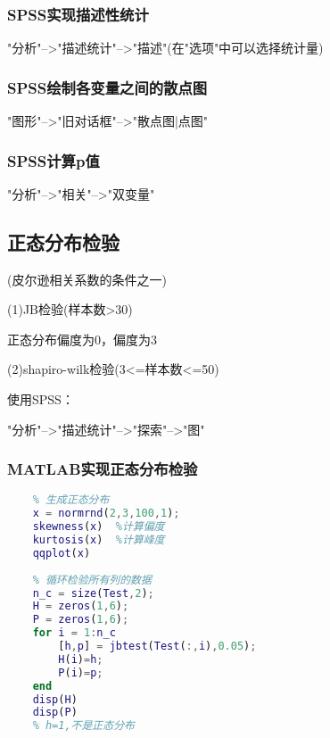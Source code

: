\documentclass{article}
\begin{document}
\subsubsection{SPSS实现描述性统计}
"分析"-->"描述统计"-->"描述"(在"选项"中可以选择统计量)



\subsubsection{SPSS绘制各变量之间的散点图}
"图形"-->"旧对话框"-->"散点图|点图"


\subsubsection{SPSS计算p值}
"分析"-->"相关"-->"双变量"

\subsection{正态分布检验}
(皮尔逊相关系数的条件之一)

(1)JB检验(样本数>30)

正态分布偏度为0，偏度为3

(2)shapiro-wilk检验(3<=样本数<=50)

使用SPSS：

"分析"-->"描述统计"-->"探索"-->"图"

\subsubsection{MATLAB实现正态分布检验}
\begin{lstlisting}[language=Matlab]
    %% 正态分布检验
    % 生成正态分布
    x = normrnd(2,3,100,1);   
    skewness(x)  %计算偏度
    kurtosis(x)  %计算峰度
    qqplot(x)
        
    % 循环检验所有列的数据
    n_c = size(Test,2);  
    H = zeros(1,6);  
    P = zeros(1,6);
    for i = 1:n_c
        [h,p] = jbtest(Test(:,i),0.05);
        H(i)=h;
        P(i)=p;
    end
    disp(H)
    disp(P)
    % h=1,不是正态分布

\end{lstlisting} 
\end{document}
